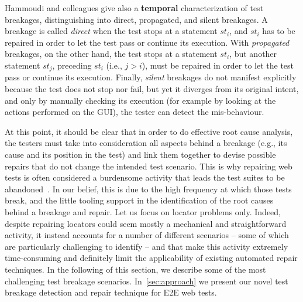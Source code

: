 Hammoudi and colleagues give also a \textbf{temporal} characterization of test breakages, distinguishing into direct, propagated, and silent breakages. A breakage is called \textit{direct} when the test stops at a statement $st_i$, and $st_i$ has to be repaired in order to let the test pass or continue its execution. With \textit{propagated} breakages, on the other hand, the test stops at a statement $st_i$, but another statement $st_j$, preceding $st_i$ (i.e., $j > i$), must be repaired in order to let the test pass or continue its execution. Finally, \textit{silent} breakages do not manifest explicitly because the test does not stop nor fail, but yet it diverges from its original intent, and only by manually checking its execution (for example by looking at the actions performed on the GUI), the tester can detect the mis-behaviour.

At this point, it should be clear that in order to do effective root cause analysis, the testers must take into consideration all aspects behind a breakage (e.g., its cause and its position in the test) and link them together to devise possible repairs that do not change the intended test scenario. This is why repairing web tests is often considered a burdensome activity that leads the test suites to be abandoned~\cite{Christophe2014}. In our belief, this is due to the high frequency at which those tests break, and the little tooling support in the identification of the root causes behind a breakage and repair.
%
Let us focus on locator problems only. Indeed, despite repairing locators could seem mostly a mechanical and straightforward activity, it instead accounts for a number of different scenarios -- some of which are particularly challenging to identify -- and that make this activity extremely time-consuming and 
definitely limit the applicability of existing automated repair techniques. In the following of this section, we describe some of the most challenging test breakage scenarios. In~\autoref{sec:approach} we present our novel test breakage detection and repair technique for E2E web tests.


